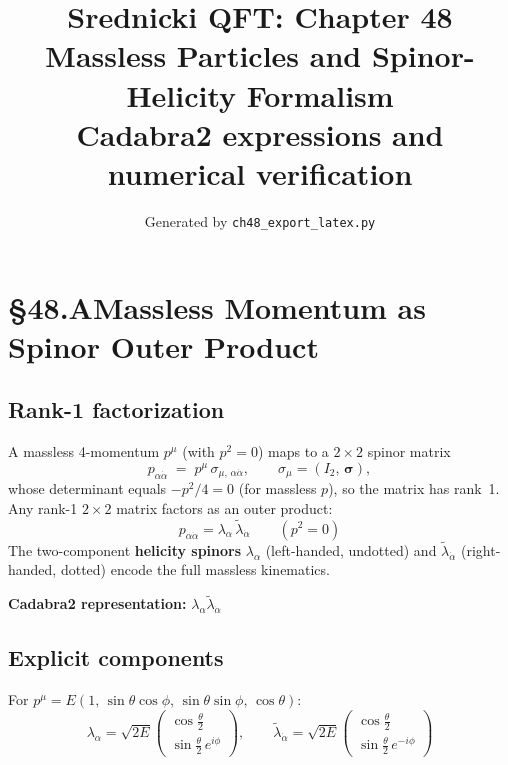 \documentclass[12pt]{article}
\title{\textbf{Srednicki QFT: Chapter 48}\\[6pt]
       \large Massless Particles and Spinor-Helicity Formalism\\[4pt]
       \normalsize Cadabra2 expressions and numerical verification}
\author{Generated by \texttt{ch48\_export\_latex.py}}
\date{}
\newcommand{\cdbexpr}[1]{\textcolor{cadblue}{$#1$}}
\begin{document}
\maketitle
\tableofcontents
\newpage

\section{§48.A\quad Massless Momentum as Spinor Outer Product}

\subsection{Rank-1 factorization}

A massless 4-momentum $p^\mu$ (with $p^2=0$) maps to a $2\times2$ spinor matrix
\begin{equation}
  p_{\alpha\dot\alpha} \;=\; p^\mu\,\sigma_{\mu,\,\alpha\dot\alpha},
  \qquad
  \sigma_\mu = (I_2,\,\boldsymbol{\sigma}),
  \tag{48.1}
\end{equation}
whose determinant equals $-p^2/4=0$ (for massless $p$), so the matrix has rank~1.
Any rank-1 $2\times2$ matrix factors as an outer product:
\begin{equation}
  \boxed{
    p_{\alpha\dot\alpha} = \lambda_\alpha\,\tilde\lambda_{\dot\alpha}
  }
  \qquad (p^2 = 0)
  \tag{48.2}
\end{equation}
The two-component \textbf{helicity spinors} $\lambda_\alpha$ (left-handed, undotted)
and $\tilde\lambda_{\dot\alpha}$ (right-handed, dotted) encode the full massless kinematics.

\medskip
\textbf{Cadabra2 representation:} \cdbexpr{\lambda_{\alpha} \tilde{\lambda}_{\dot{\alpha}}}

\subsection{Explicit components}

For $p^\mu = E(1,\,\sin\theta\cos\phi,\,\sin\theta\sin\phi,\,\cos\theta)$:
\begin{equation}
  \lambda_\alpha = \sqrt{2E}\begin{pmatrix}\cos\tfrac\theta2 \\ \sin\tfrac\theta2\,e^{i\phi}\end{pmatrix},
  \qquad
  \tilde\lambda_{\dot\alpha} = \sqrt{2E}\begin{pmatrix}\cos\tfrac\theta2 \\ \sin\tfrac\theta2\,e^{-i\phi}\end{pmatrix}
  \tag{48.3}
\end{equation}
\end{document}
